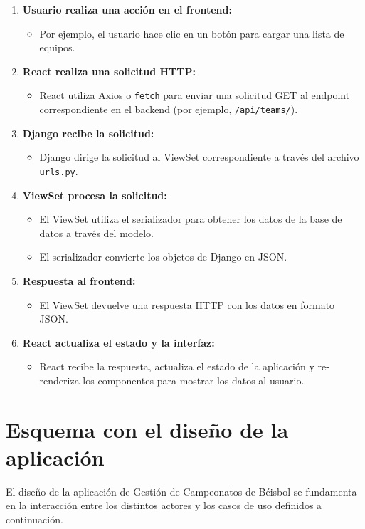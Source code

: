\documentclass{report}
\begin{document}
    \begin{enumerate}
        \item \textbf{Usuario realiza una acción en el frontend:}
        \begin{itemize}
            \item Por ejemplo, el usuario hace clic en un botón para cargar una lista de equipos.
        \end{itemize}
        \item \textbf{React realiza una solicitud HTTP:}
        \begin{itemize}
            \item React utiliza Axios o \texttt{fetch} para enviar una solicitud GET al endpoint correspondiente en el backend (por ejemplo, \texttt{/api/teams/}).
        \end{itemize}
        \item \textbf{Django recibe la solicitud:}
        \begin{itemize}
            \item Django dirige la solicitud al ViewSet correspondiente a través del archivo \texttt{urls.py}.
        \end{itemize}
        \item \textbf{ViewSet procesa la solicitud:}
        \begin{itemize}
            \item El ViewSet utiliza el serializador para obtener los datos de la base de datos a través del modelo.
            \item El serializador convierte los objetos de Django en JSON.
        \end{itemize}
        \item \textbf{Respuesta al frontend:}
        \begin{itemize}
            \item El ViewSet devuelve una respuesta HTTP con los datos en formato JSON.
        \end{itemize}
        \item \textbf{React actualiza el estado y la interfaz:}
        \begin{itemize}
            \item React recibe la respuesta, actualiza el estado de la aplicación y re-renderiza los componentes para mostrar los datos al usuario.
        \end{itemize}
    \end{enumerate}
    \section*{Esquema con el diseño de la aplicación}
    El diseño de la aplicación de Gestión de Campeonatos de Béisbol se fundamenta en la interacción 
    entre los distintos actores y los casos de uso definidos a continuación. \\ 
\end{document}
